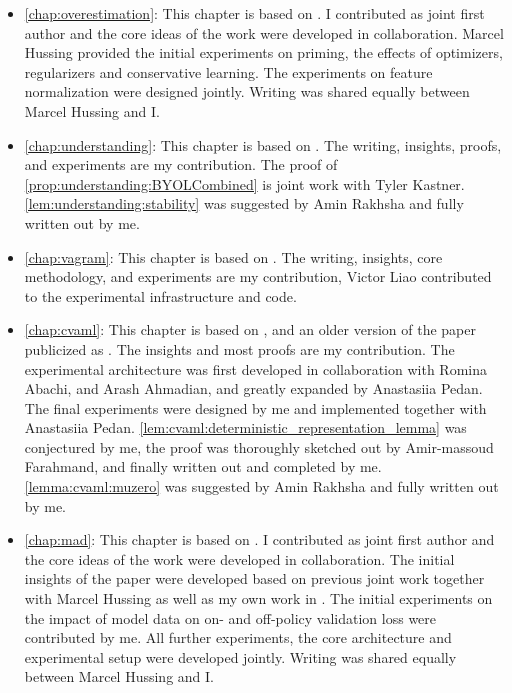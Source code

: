 \begin{itemize}
    \item \autoref{chap:overestimation}: This chapter is based on . I contributed as joint first author and the core ideas of the work were developed in collaboration. Marcel Hussing provided the initial experiments on priming, the effects of optimizers, regularizers and conservative learning. The experiments on feature normalization were designed jointly. Writing was shared equally between Marcel Hussing and I.
    \item \autoref{chap:understanding}: This chapter is based on . The writing, insights, proofs, and experiments are my contribution. The proof of \autoref{prop:understanding:BYOLCombined} is joint work with Tyler Kastner. \autoref{lem:understanding:stability} was suggested by Amin Rakhsha and fully written out by me.
    \item \autoref{chap:vagram}: This chapter is based on . The writing, insights, core methodology, and experiments are my contribution, Victor Liao contributed to the experimental infrastructure and code.
    \item \autoref{chap:cvaml}: This chapter is based on , and an older version of the paper publicized as . The insights and most proofs are my contribution. The experimental architecture was first developed in collaboration with Romina Abachi, and Arash Ahmadian, and greatly expanded by Anastasiia Pedan. The final experiments were designed by me and implemented together with Anastasiia Pedan. \autoref{lem:cvaml:deterministic_representation_lemma} was conjectured by me, the proof was thoroughly sketched out by Amir-massoud Farahmand, and finally written out and completed by me. \autoref{lemma:cvaml:muzero} was suggested by Amin Rakhsha and fully written out by me.
    \item \autoref{chap:mad}: This chapter is based on . I contributed as joint first author and the core ideas of the work were developed in collaboration. The initial insights of the paper were developed based on previous joint work \parencite{hussing2024dissecting} together with Marcel Hussing as well as my own work in \textcite{voelcker2023lambda}. The initial experiments on the impact of model data on on- and off-policy validation loss were contributed by me. All further experiments, the core architecture and experimental setup were developed jointly. Writing was shared equally between Marcel Hussing and I.
\end{itemize}


